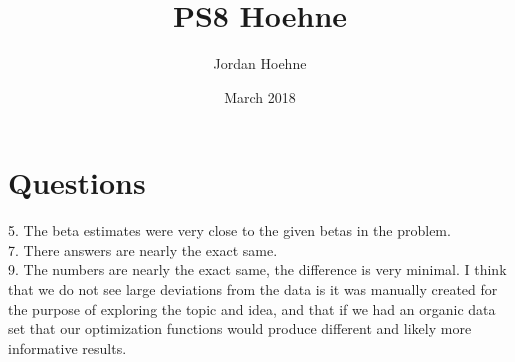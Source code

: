 \documentclass{article}
\title{PS8 Hoehne}
\author{Jordan Hoehne }
\date{March 2018}
\begin{document}
\maketitle

\section{Questions}
5. The beta estimates were very close to the given betas in the problem. \\
7. There answers are nearly the exact same.\\
9. The numbers are nearly the exact same, the difference is very minimal. I think that we do not see large deviations from the data is it was manually created for the purpose of exploring the topic and idea, and that if we had an organic data set that our optimization functions would produce different and likely more informative results. 
\end{document}
